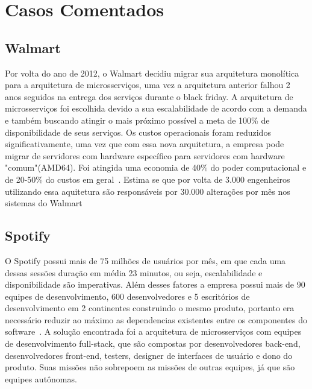 \chapter{Casos Comentados}
\label{cap2}

\section{Walmart}
Por volta do ano de 2012, o Walmart decidiu migrar sua arquitetura monolítica para a arquitetura de microsserviços, uma vez a arquitetura anterior falhou 2 anos seguidos na entrega dos serviços durante o black friday.
A arquitetura de microsserviços foi escolhida devido a sua escalabilidade de acordo com a demanda e também buscando atingir o mais próximo possível a meta de 100\% de disponibilidade de seus serviços.
Os custos operacionais foram reduzidos significativamente, uma vez que com essa nova arquitetura, a empresa pode migrar de servidores com hardware específico para servidores com hardware "comum"(AMD64). Foi atingida uma economia de 40\% do poder computacional e de 20-50\% do custos em geral~\cite{msWalmartSpotify}.
Estima se que por volta de 3.000 engenheiros utilizando essa aquitetura são responsáveis por 30.000 alterações por mês nos sistemas do Walmart~\cite{microservicesWalmart1}

\section{Spotify}
 O Spotify possui mais de 75 milhões de usuários por mês, em que cada uma dessas sessões duração em média 23 minutos, ou seja, escalabilidade e disponibilidade são imperativas.
Além desses fatores a empresa possui mais de 90 equipes de desenvolvimento, 600 desenvolvedores e 5 escritórios de desenvolvimento em 2 continentes construindo o mesmo produto, portanto era necessário reduzir ao máximo as dependencias existentes entre os componentes do software~\cite{msWalmartSpotify}.
A solução encontrada foi a arquitetura de microsserviços com equipes de desenvolvimento full-stack, que são compostas por desenvolvedores back-end, desenvolvedores front-end, testers, designer de interfaces de usuário e dono do produto. Suas missões não sobrepoem as missões de outras equipes, já que são equipes autônomas.

